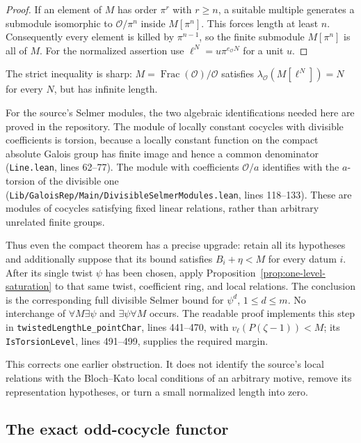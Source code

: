 \begin{proof}
If an element of \(M\) has order \(\pi^r\) with \(r\geq n\), a suitable
multiple generates a submodule isomorphic to \(\mathcal O/\pi^n\)
inside \(M[\pi^n]\). This forces length at least \(n\).
Consequently every element is killed by \(\pi^{n-1}\), so the finite
submodule \(M[\pi^n]\) is all of \(M\).
For the normalized assertion use
\(\ell^N=u\pi^{e_{\mathcal O}N}\) for a unit \(u\).
\end{proof}

The strict inequality is sharp:
\(M=\operatorname{Frac}(\mathcal O)/\mathcal O\) satisfies
\(\lambda_{\mathcal O}(M[\ell^N])=N\) for every \(N\), but has infinite
length.

For the source's Selmer modules, the two algebraic identifications
needed here are proved in the repository. The module of locally
constant cocycles with divisible coefficients is torsion, because
a locally constant function on the compact absolute Galois group
has finite image and hence a common denominator
(\texttt{Line.lean}, lines 62--77). The module with coefficients
\(\mathcal O/a\) identifies with the \(a\)-torsion of the divisible
one (\texttt{Lib/GaloisRep/Main/DivisibleSelmerModules.lean},
lines 118--133). These are modules of cocycles satisfying fixed
linear relations, rather than arbitrary unrelated finite groups.

Thus even the compact theorem has a precise upgrade: retain all its
hypotheses and additionally suppose that its bound satisfies
\(B_i+\eta<M\) for every datum \(i\). After its single twist \(\psi\)
has been chosen, apply Proposition~\ref{prop:one-level-saturation}
to that same twist, coefficient ring, and local relations. The
conclusion is the corresponding full divisible Selmer bound for
\(\psi^d\), \(1\leq d\leq m\). No interchange of
\(\forall M\exists\psi\) and \(\exists\psi\forall M\) occurs.
The readable proof implements this step in
\texttt{twistedLengthLe\_pointChar}, lines 441--470, with
\(v_\ell(P(\zeta-1))<M\); its
\texttt{IsTorsionLevel}, lines 491--499, supplies the required margin.

This corrects one earlier obstruction. It does not identify the
source's local relations with the Bloch--Kato local conditions of an
arbitrary motive, remove its representation hypotheses, or turn a
small normalized length into zero.

\subsection{The exact odd-cocycle functor}

